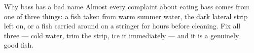 \begin{telospanel}{Why bass has a bad name}
Almost every complaint about eating bass comes from one of three things: a fish taken from warm summer water, the dark lateral strip left on, or a fish carried around on a stringer for hours before cleaning. Fix all three --- cold water, trim the strip, ice it immediately --- and it is a genuinely good fish. 
\end{telospanel}




